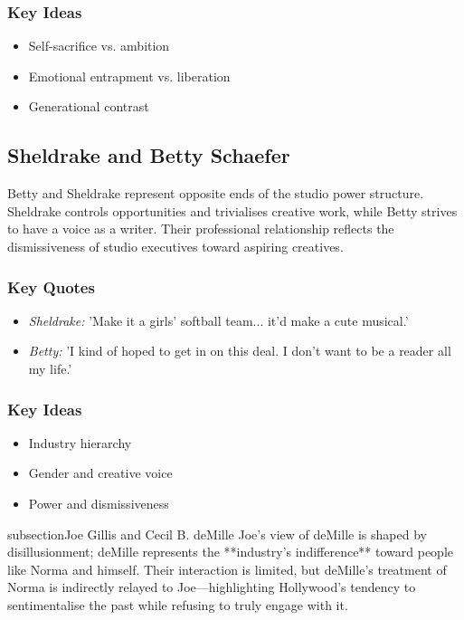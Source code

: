 \documentclass[a4paper]{article}
\begin{document}
\subsubsection*{Key Ideas}
\begin{itemize}
    \item Self-sacrifice vs. ambition
    \item Emotional entrapment vs. liberation
    \item Generational contrast
\end{itemize}

\subsection{Sheldrake and Betty Schaefer}
Betty and Sheldrake represent opposite ends of the studio power structure. Sheldrake controls opportunities and trivialises creative work, while Betty strives to have a voice as a writer. Their professional relationship reflects the dismissiveness of studio executives toward aspiring creatives.

\subsubsection*{Key Quotes}
\begin{itemize}
    \item \textit{Sheldrake:} 'Make it a girls’ softball team... it’d make a cute musical.'
    \item \textit{Betty:} 'I kind of hoped to get in on this deal. I don’t want to be a reader all my life.'
\end{itemize}

\subsubsection*{Key Ideas}
\begin{itemize}
    \item Industry hierarchy
    \item Gender and creative voice
    \item Power and dismissiveness
\end{itemize}

subsection{Joe Gillis and Cecil B. deMille}
Joe’s view of deMille is shaped by disillusionment; deMille represents the **industry's indifference** toward people like Norma and himself. Their interaction is limited, but deMille’s treatment of Norma is indirectly relayed to Joe—highlighting Hollywood’s tendency to sentimentalise the past while refusing to truly engage with it.
\end{document}
